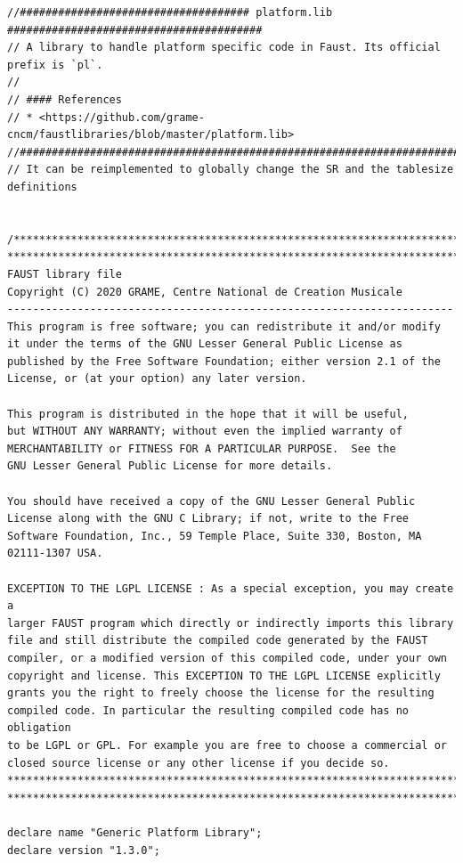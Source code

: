 \documentclass{article}
\begin{document}
\bigskip\bigskip
\begin{lstlisting}[caption=\texttt{platform.lib}]
//#################################### platform.lib ########################################
// A library to handle platform specific code in Faust. Its official prefix is `pl`.
//
// #### References
// * <https://github.com/grame-cncm/faustlibraries/blob/master/platform.lib>
//########################################################################################
// It can be reimplemented to globally change the SR and the tablesize definitions


/************************************************************************
************************************************************************
FAUST library file
Copyright (C) 2020 GRAME, Centre National de Creation Musicale
----------------------------------------------------------------------
This program is free software; you can redistribute it and/or modify
it under the terms of the GNU Lesser General Public License as
published by the Free Software Foundation; either version 2.1 of the
License, or (at your option) any later version.

This program is distributed in the hope that it will be useful,
but WITHOUT ANY WARRANTY; without even the implied warranty of
MERCHANTABILITY or FITNESS FOR A PARTICULAR PURPOSE.  See the
GNU Lesser General Public License for more details.

You should have received a copy of the GNU Lesser General Public
License along with the GNU C Library; if not, write to the Free
Software Foundation, Inc., 59 Temple Place, Suite 330, Boston, MA
02111-1307 USA.

EXCEPTION TO THE LGPL LICENSE : As a special exception, you may create a
larger FAUST program which directly or indirectly imports this library
file and still distribute the compiled code generated by the FAUST
compiler, or a modified version of this compiled code, under your own
copyright and license. This EXCEPTION TO THE LGPL LICENSE explicitly
grants you the right to freely choose the license for the resulting
compiled code. In particular the resulting compiled code has no obligation
to be LGPL or GPL. For example you are free to choose a commercial or
closed source license or any other license if you decide so.
************************************************************************
************************************************************************/

declare name "Generic Platform Library";
declare version "1.3.0";


\end{lstlisting}
\end{document}
